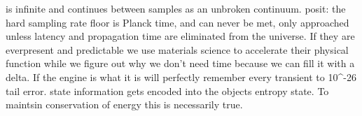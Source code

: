 is infinite and continues between samples as an unbroken continuum. posit: the hard sampling rate floor is Planck time, and can never be met, only approached unless latency and propagation time are eliminated from the universe. If they are everpresent and predictable we use materials science to accelerate their physical function while we figure out why we don't need time because we can fill it with a delta. If the engine is what it is will perfectly remember every transient to 10\textasciicircum{}-26 tail error. state information gets encoded into the objects entropy state. To maintsin conservation of energy this is necessarily true.

